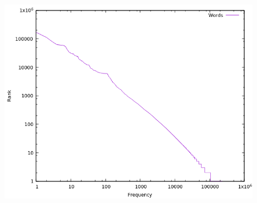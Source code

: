 \documentclass{article}
\begin{document}
		\begin{figure}[]
			\begin{minipage}{.45\textwidth}
				\centering
				\includegraphics[width=\linewidth]{words_graph.png}
				

\end{minipage}
\end{figure}
\end{document}
